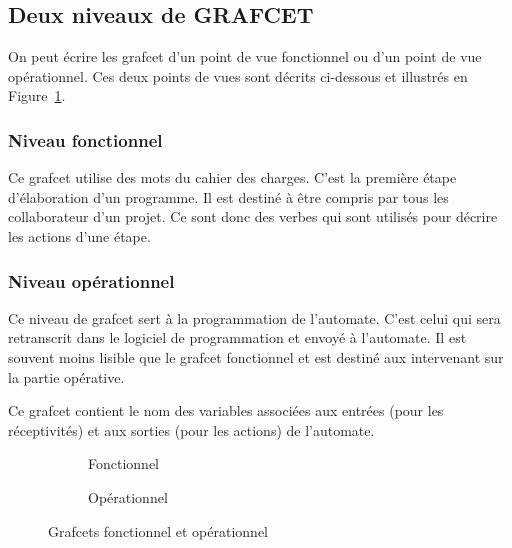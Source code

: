 \subsection{Deux niveaux de GRAFCET}
On peut écrire les grafcet d'un point de vue fonctionnel ou d'un point de vue opérationnel. Ces deux points de vues sont décrits ci-dessous et illustrés en Figure~\ref{fig:fonctionnelVsOperationnel}.
\subsubsection{Niveau fonctionnel}
Ce grafcet utilise des mots du cahier des charges. C'est la première étape d'élaboration d'un programme. Il est destiné à être compris par tous les collaborateur d'un projet. Ce sont donc des verbes qui sont utilisés pour décrire les actions d'une étape.
\subsubsection{Niveau opérationnel}
Ce niveau de grafcet sert à la programmation de l'automate. C'est celui qui sera retranscrit dans le logiciel de programmation et envoyé à l'automate. Il est souvent moins lisible que le grafcet fonctionnel et est destiné aux intervenant sur la partie opérative.

Ce grafcet contient le nom des variables associées aux entrées (pour les réceptivités) et aux sorties (pour les actions) de l'automate.


\begin{figure}
  \centering
  \begin{subfigure}[b]{.48\textwidth}
    
    \caption{Fonctionnel}
  \end{subfigure}
  \begin{subfigure}[b]{.48\textwidth}
    
    \caption{Opérationnel}
  \end{subfigure}
  \label{fig:fonctionnelVsOperationnel}
  \caption{Grafcets fonctionnel et opérationnel}
\end{figure}
